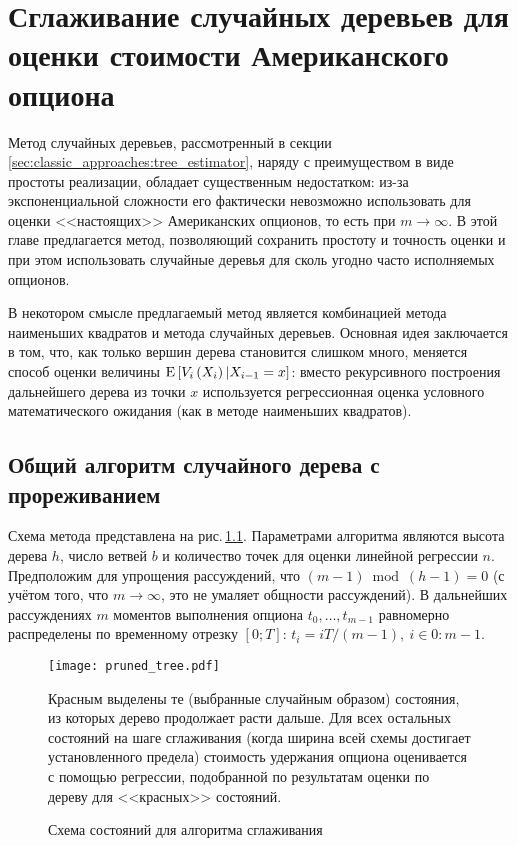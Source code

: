 \chapter{Сглаживание случайных деревьев для оценки стоимости Американского опциона} %
\label{cha:tree_pruning_for_american_option}

Метод случайных деревьев, рассмотренный в секции \ref{sec:classic_approaches:tree_estimator}, наряду с преимуществом в виде простоты реализации, обладает существенным недостатком: из-за экспоненциальной сложности его фактически невозможно использовать для оценки <<настоящих>> Американских опционов, то есть при $m \to \infty$. В этой главе предлагается метод, позволяющий сохранить простоту и точность оценки и при этом использовать случайные деревья для сколь угодно часто исполняемых опционов.

В некотором смысле предлагаемый метод является комбинацией метода наименьших квадратов и метода случайных деревьев. Основная идея заключается в том, что, как только вершин дерева становится слишком много, меняется способ оценки величины $\mathrm{E}\left[V_i\left(X_i\right)|X_{i-1}=x\right]$: вместо рекурсивного построения дальнейшего дерева из точки $x$ используется регрессионная оценка условного математического ожидания (как в методе наименьших квадратов).

\section{Общий алгоритм случайного дерева с прореживанием} %
\label{sec:tree_pruning:general_algorithm}

Схема метода представлена на рис.\,\ref{fig:pruned_tree}. Параметрами алгоритма являются высота дерева $h$, число ветвей $b$ и количество точек для оценки линейной регрессии $n$. Предположим для упрощения рассуждений, что $(m-1) \bmod (h-1) = 0$ (с учётом того, что $m \to \infty$, это не умаляет общности рассуждений). В дальнейших рассуждениях $m$ моментов выполнения опциона $t_0, \dots, t_{m-1}$ равномерно распределены по временному отрезку ${[0; T]}$: $t_i = i T / (m-1), \: i\in 0\mathbin{:} {m-1}$. 

\begin{figure}[h!]
    \centering
    \texttt{[image: pruned\_tree.pdf]}
    \caption{Схема состояний для алгоритма сглаживания}
    \label{fig:pruned_tree}
    \footnotesize
    Красным выделены те (выбранные случайным образом) состояния, из которых дерево продолжает расти дальше. Для всех остальных состояний на шаге сглаживания (когда ширина всей схемы достигает установленного предела) стоимость удержания опциона оценивается с помощью регрессии, подобранной по результатам оценки по дереву для <<красных>> состояний.
\end{figure}

